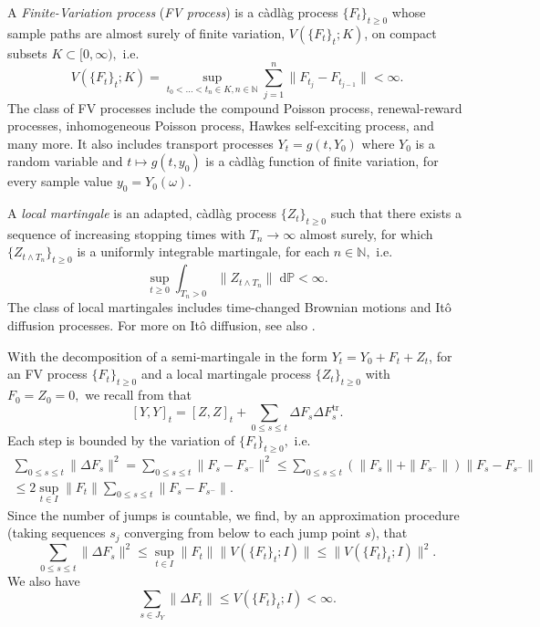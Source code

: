 \documentclass[reqno,12pt]{amsart}
\theoremstyle{plain} %
\theoremstyle{definition} %
\newcommand{\tr}{{\operatorname{tr}}}
\begin{document}
A \emph{Finite-Variation process} (\emph{FV process}) is a c\`adl\`ag process $\{F_t\}_{t \geq 0}$ whose sample paths are almost surely of finite variation, $V(\{F_t\}_t; K)$, on compact subsets $K\subset [0, \infty),$ i.e.
\[ V(\{F_t\}_t; K) = \sup_{t_0 < \ldots < t_n \in K, n\in \mathbb{N}} \sum_{j=1}^n \|F_{t_j} - F_{t_{j-1}}\| < \infty.
\]
The class of FV processes include the compound Poisson process, renewal-reward processes, inhomogeneous Poisson process, Hawkes self-exciting process, and many more. It also includes transport processes $Y_t = g(t, Y_0)$ where $Y_0$ is a random variable and $t \mapsto g(t, y_0)$ is a c\`adl\`ag function of finite variation, for every sample value $y_0=Y_0(\omega)$.

A \emph{local martingale} is an adapted, c\`adl\`ag process $\{Z_t\}_{t\geq 0}$ such that there exists a sequence of increasing stopping times with $T_n \rightarrow \infty$ almost surely, for which $\{Z_{t \wedge T_n}\}_{t \geq 0}$ is a uniformly integrable martingale, for each $n\in\mathbb{N},$ i.e.
\[
    \sup_{t \geq 0} \int_{T_n > 0}\|Z_{t\wedge T_n}\|\;\mathrm{d}\mathbb{P} < \infty.
\]
The class of local martingales includes time-changed Brownian motions and It\^o diffusion processes. For more on It\^o diffusion, see also \cite{Oksendal2003}.

With the decomposition of a semi-martingale in the form $Y_t = Y_0 + F_t + Z_t$, for an FV process $\{F_t\}_{t\geq 0}$ and a local martingale process $\{Z_t\}_{t\geq 0}$ with $F_0 = Z_0 = 0,$ we recall from \cite[Lemma 18.7]{Metivier1982} that
\[
    [Y, Y]_t = [Z, Z]_t + \sum_{0 \leq s \leq t} \Delta F_s \Delta F_s^\tr.
\]
Each step is bounded by the variation of $\{F_t\}_{t\geq 0},$ i.e.
\begin{multline*}
    \sum_{0 \leq s \leq t} \|\Delta F_s\|^2 = \sum_{0 \leq s \leq t} \|F_s - F_{s^-}\|^2 \leq \sum_{0 \leq s \leq t} (\|F_s\| + \|F_{s^-}\|)\|F_s - F_{s^-}\| \\
    \leq 2\sup_{t\in I} \|F_t\| \sum_{0 \leq s \leq t} \|F_s - F_{s^-}\|.
\end{multline*}
Since the number of jumps is countable, we find, by an approximation procedure (taking sequences $s_j$ converging from below to each jump point $s$), that
\[
    \sum_{0 \leq s \leq t} \|\Delta F_s\|^2 \leq \sup_{t\in I} \|F_t\| \|V(\{F_t\}_t; I)\| \leq \|V(\{F_t\}_t; I)\|^2.
\]
We also have
\begin{equation}
    \label{estimatejumpfv}
    \sum_{s\in J_{Y}} \|\Delta F_t\| \leq V(\{F_t\}_t; I) < \infty.
\end{equation}
\end{document}
